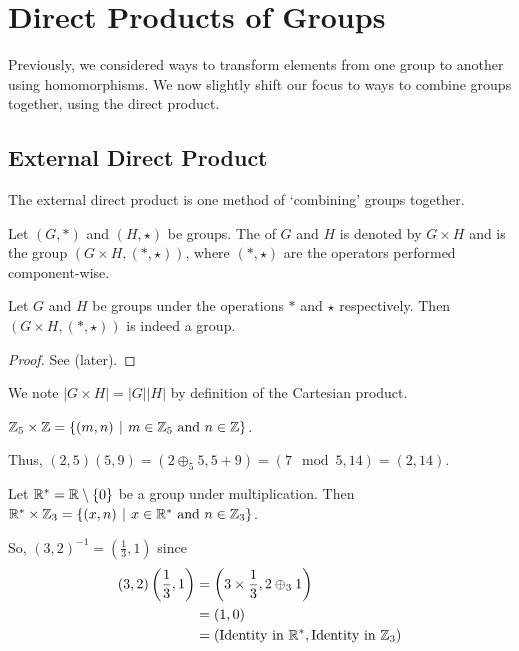 \chapter{Direct Products of Groups}
Previously, we considered ways to transform elements from one group to another using homomorphisms. We now slightly shift our focus to ways to combine groups together, using the direct product.

\section{External Direct Product}
The external direct product is one method of `combining' groups together.
\begin{definition}
    Let $(G, \ast)$ and $(H, \star)$ be groups. The  of $G$ and $H$ is denoted by $G\times H$ and is the group $(G\times H, (\ast, \star))$, where $(\ast, \star)$ are the operators performed component-wise.
\end{definition}

\begin{proposition}\label{prop-external-direct-product-is-group}
    Let $G$ and $H$ be groups under the operations $\ast$ and $\star$ respectively. Then $(G \times H, (\ast, \star))$ is indeed a group.
\end{proposition}
\begin{proof}
    See  (later).
\end{proof}

We note $|G \times H| = |G||H|$ by definition of the Cartesian product.

\begin{example}
    $\Z_5 \times \Z = \{(m,n) \vert m \in \Z_5 \text{ and } n \in \Z\}$.

    Thus, $(2, 5)(5, 9) = (2 \oplus_5 5, 5 + 9) = (7 \mod 5, 14) = (2, 14)$.
\end{example}

\begin{example}
    Let $\mathbb{R}^\ast = \mathbb{R}\setminus\{0\}$ be a group under multiplication. Then $\R^\ast \times \Z_3 = \{ (x, n) \vert x \in \R^\ast \text{ and } n \in \Z_3\}$.

    So, $(3, 2)^{-1} = \left(\frac13, 1\right)$ since
    \begin{align*}
        (3, 2)\left(\frac13, 1\right) &= \left(3 \times \frac13, 2 \oplus_3 1\right)\\
        &= (1, 0)\\
        &= (\text{Identity in }\mathbb{R}^\ast, \text{Identity in }\mathbb{Z}_3)
    \end{align*}
\end{example}

